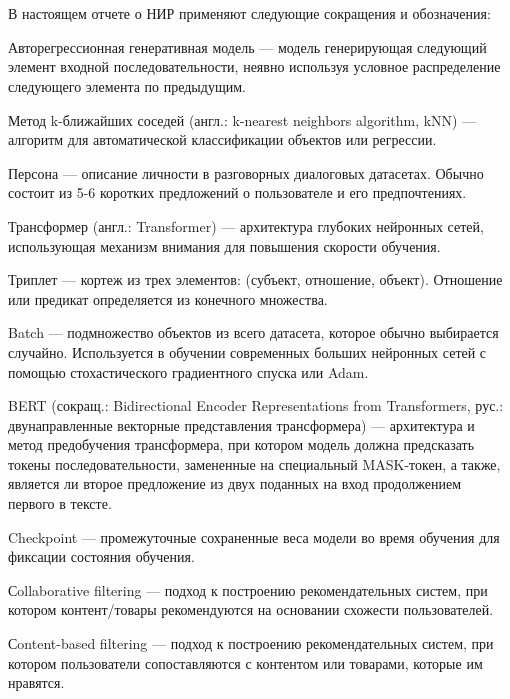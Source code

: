 \chapter{}

В настоящем отчете о НИР применяют следующие сокращения и обозначения:

Авторегрессионная генеративная модель --- модель генерирующая следующий элемент входной последовательности, неявно используя условное распределение следующего элемента по предыдущим.

Метод k-ближайших соседей (англ.: k-nearest neighbors algorithm, kNN) --- алгоритм для автоматической классификации объектов или регрессии.

Персона --- описание личности в разговорных диалоговых датасетах. Обычно состоит из 5-6 коротких предложений о пользователе и его предпочтениях.

Трансформер (англ.: Transformer) --- архитектура глубоких нейронных сетей, использующая механизм внимания для повышения скорости обучения.

Триплет --- кортеж из трех элементов: (субъект, отношение, объект). Отношение или предикат определяется из конечного множества.

Batch --- подмножество объектов из всего датасета, которое обычно выбирается случайно. Используется в обучении современных больших нейронных сетей с помощью стохастического градиентного спуска или Adam.

BERT (сокращ.: Bidirectional Encoder Representations from Transformers, рус.: двунаправленные векторные представления трансформера) --- архитектура и метод предобучения трансформера, при котором модель должна предсказать токены последовательности, замененные на специальный MASK-токен, а также, является ли второе предложение из двух поданных на вход продолжением первого в тексте.

Checkpoint --- промежуточные сохраненные веса модели во время обучения для фиксации состояния обучения.

Сollaborative filtering --- подход к построению рекомендательных систем, при котором контент/товары рекомендуются на основании схожести пользователей. 

Сontent-based filtering --- подход к построению рекомендательных систем, при котором пользователи сопоставляются с контентом или товарами, которые им нравятся.

